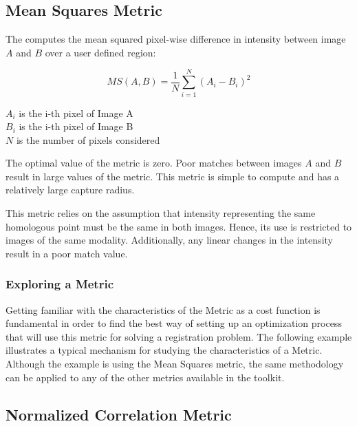\subsection{Mean Squares Metric}
\label{sec:MeanSquaresMetricv4}

The  computes the mean squared
pixel-wise difference in intensity between image $A$ and $B$ over a user
defined region:

\begin{equation}
MS(A,B) = \frac{1}{N} \sum_{i=1}^N \left( A_i - B_i \right)^2
\end{equation}
\begin{center}
$A_i$ is the i-th pixel of Image A\\
$B_i$ is the i-th pixel of Image B\\
$N$ is the number of pixels considered
\end{center}

The optimal value of the metric is zero. Poor matches between images $A$ and
$B$ result in large values of the metric. This metric is simple to compute and
has a relatively large capture radius.

This metric relies on the assumption that intensity representing the same
homologous point must be the same in both images. Hence, its use is restricted
to images of the same modality. Additionally, any linear changes in the
intensity result in a poor match value.

\subsubsection{Exploring a Metric}
\label{sec:ExploringAMetric}

Getting familiar with the characteristics of the Metric as a cost function is
fundamental in order to find the best way of setting up an optimization process
that will use this metric for solving a registration problem. The following
example illustrates a typical mechanism for studying the characteristics of a
Metric. Although the example is using the Mean Squares metric, the same
methodology can be applied to any of the other metrics available in the
toolkit.




\subsection{Normalized Correlation Metric}
\label{sec:NormalizedCorrelationMetric}

